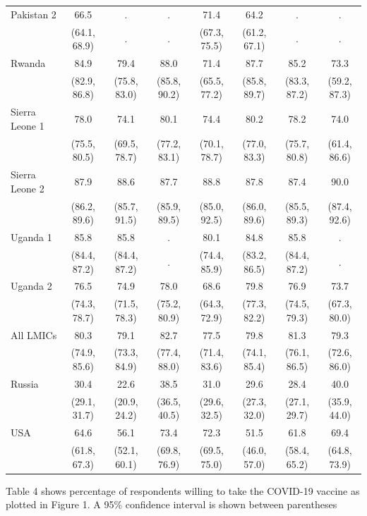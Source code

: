\documentclass[
  12pt,
]{article}
\begin{document}
\begin{table}[!h]
{\begin{threeparttable}
\begin{tabular}[t]{lccccccc}
Pakistan 2 & 66.5 & . & . & 71.4 & 64.2 & . & .\\
 & (64.1, 68.9) & . & . & (67.3, 75.5) & (61.2, 67.1) & . & .\\
Rwanda & 84.9 & 79.4 & 88.0 & 71.4 & 87.7 & 85.2 & 73.3\\
 & (82.9, 86.8) & (75.8, 83.0) & (85.8, 90.2) & (65.5, 77.2) & (85.8, 89.7) & (83.3,  87.2) & (59.2,  87.3)\\
Sierra Leone 1 & 78.0 & 74.1 & 80.1 & 74.4 & 80.2 & 78.2 & 74.0\\
 & (75.5, 80.5) & (69.5, 78.7) & (77.2, 83.1) & (70.1, 78.7) & (77.0, 83.3) & (75.7,  80.8) & (61.4,  86.6)\\
Sierra Leone 2 & 87.9 & 88.6 & 87.7 & 88.8 & 87.8 & 87.4 & 90.0\\
 & (86.2, 89.6) & (85.7, 91.5) & (85.9, 89.5) & (85.0, 92.5) & (86.0, 89.6) & (85.5,  89.3) & (87.4,  92.6)\\
Uganda 1 & 85.8 & 85.8 & . & 80.1 & 84.8 & 85.8 & .\\
 & (84.4, 87.2) & (84.4, 87.2) & . & (74.4, 85.9) & (83.2, 86.5) & (84.4,  87.2) & .\\
Uganda 2 & 76.5 & 74.9 & 78.0 & 68.6 & 79.8 & 76.9 & 73.7\\
 & (74.3, 78.7) & (71.5, 78.3) & (75.2, 80.9) & (64.3, 72.9) & (77.3, 82.2) & (74.5,  79.3) & (67.3,  80.0)\\
All LMICs & 80.3 & 79.1 & 82.7 & 77.5 & 79.8 & 81.3 & 79.3\\
 & (74.9, 85.6) & (73.3, 84.9) & (77.4, 88.0) & (71.4, 83.6) & (74.1, 85.4) & (76.1,  86.5) & (72.6,  86.0)\\
Russia & 30.4 & 22.6 & 38.5 & 31.0 & 29.6 & 28.4 & 40.0\\
 & (29.1, 31.7) & (20.9, 24.2) & (36.5, 40.5) & (29.6, 32.5) & (27.3, 32.0) & (27.1,  29.7) & (35.9,  44.0)\\
USA & 64.6 & 56.1 & 73.4 & 72.3 & 51.5 & 61.8 & 69.4\\
 & (61.8, 67.3) & (52.1, 60.1) & (69.8, 76.9) & (69.5, 75.0) & (46.0, 57.0) & (58.4,  65.2) & (64.8,  73.9)\\
\bottomrule
\end{tabular}
\begin{tablenotes}
\item Table 4 shows percentage of respondents willing to take the COVID-19 vaccine as plotted in Figure 1. A 95\% confidence interval is shown between parentheses
\end{tablenotes}
\end{threeparttable}}
\end{table}
\end{document}
